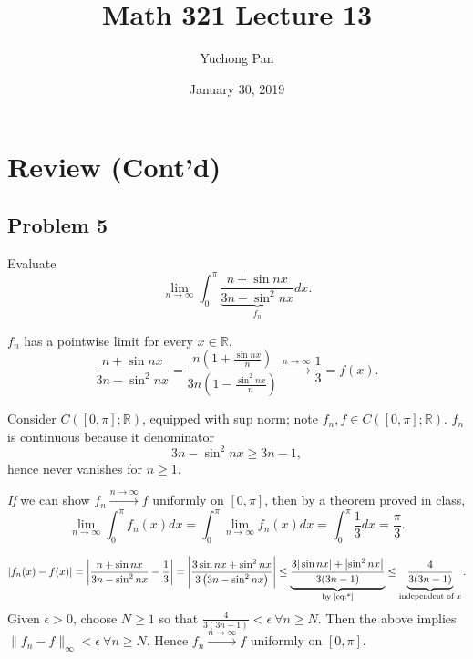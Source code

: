\documentclass[letterpaper, reqno,11pt]{article}
\newcommand{\RR}{\mathbb{R}}
\begin{document}
\title{Math 321 Lecture 13}
\author{Yuchong Pan}
\date{January 30, 2019}
\newtheorem{thm}{Theorem}
\newtheorem{defn}{Definition}
\newtheorem*{remark}{Remark}
\newtheorem{claim}{Claim}
\newtheorem{cor}{Corollary}
\newtheorem{lemma}{Lemma}
\newtheorem{prop}{Proposition}
\maketitle
%

\section{Review (Cont'd)}

\subsection{Problem 5}

Evaluate
$$ \lim_{n \to \infty} \int_0^\pi \underbrace{\frac{n + \sin nx}{3n - \sin^2 nx}}_{f_n} dx. $$

 $f_n$ has a pointwise limit for every $x \in \RR$.
$$ \frac{n + \sin nx}{3n - \sin^2 nx} = \frac{n\left(1 + \frac{\sin nx}{n}\right)}{3n\left(1 - \frac{\sin^2 nx}{n}\right)} \xrightarrow{n \to \infty} \frac{1}{3} = f(x). $$

 Consider $C([0, \pi]; \RR)$, equipped with sup norm; note $f_n, f \in C([0, \pi]; \RR)$. $f_n$ is continuous because it denominator
\begin{equation} \label{eq:*} \tag{*}
  3n - \sin^2 nx \geq 3n - 1,
\end{equation}
hence never vanishes for $n \geq 1$.

\emph{If} we can show $f_n \xrightarrow{n \to \infty} f$ uniformly on $[0, \pi]$, then by a theorem proved in class,
$$ \lim_{n \to \infty} \int_0^\pi f_n(x) dx = \int_0^\pi \lim_{n \to \infty} f_n(x) dx = \int_0^\pi \frac{1}{3} dx = \frac{\pi}{3}. $$

$$ |f_n(x) - f(x)| = \left|\frac{n + \sin nx}{3n - \sin^2 nx} - \frac{1}{3}\right| = \left|\frac{3\sin nx + \sin^2 nx}{3\left(3n - \sin^2 nx\right)}\right| \leq \underbrace{\frac{3|\sin nx| + \left|\sin^2 nx\right|}{3(3n - 1)}}_\text{by \eqref{eq:*}} \leq \underbrace{\frac{4}{3(3n - 1)}}_\text{independent of $x$}. $$
Given $\epsilon > 0$, choose $N \geq 1$ so that $\frac{4}{3(3n - 1)} < \epsilon ~ \forall n \geq N$. Then the above implies $\lVert f_n - f\rVert_\infty < \epsilon ~ \forall n \geq N$. Hence $f_n \xrightarrow{n \to \infty} f$ uniformly on $[0, \pi]$.
\end{document}

